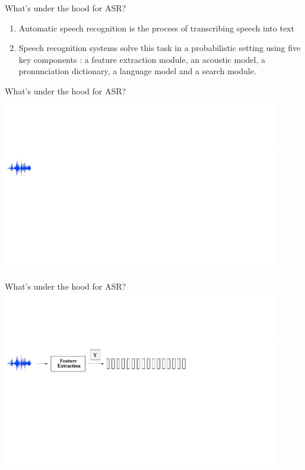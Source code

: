 \begin{frame}{What's under the hood for ASR?}
\begin{enumerate}
\item Automatic speech recognition is the process of \alert{transcribing speech into text}
\item Speech recognition systems solve this task in a probabilistic setting using five key
components \cite{FJ1997,steve1996large}: \alert{a feature extraction module, an acoustic model, a pronunciation dictionary, a language model
and a search module}.
\end{enumerate}
\end{frame}

\begin{frame}{What's under the hood for ASR?}
\includegraphics[height=77mm]{figures/ASR1}
\end{frame}

\begin{frame}{What's under the hood for ASR?}
\includegraphics[height=77mm]{figures/ASR2}
\end{frame}

